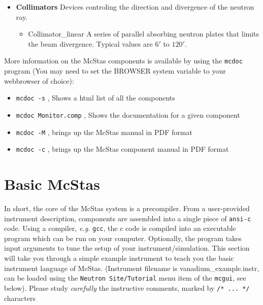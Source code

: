\begin{itemize}
\begin{itemize}
{        wavelengths of the passing neutron rays. (L is for $\lambda$).}
    \item{Monitor\_nD. General monitor for detecting all sorts of
        physical properties of the neutron ray. In our cases used with
        options:}
      \begin{itemize}
      \item{'single' - as PSD\_monitor but only one small square.}
      \item{'banana' - as PSD\_monitor but shaped like a curved,
          horizontal band.}
      \end{itemize}
    \end{itemize}
  \item{{\bf Collimators}} Devices controling the direction and divergence
   of the neutron ray.
    \begin{itemize}
      \item{Collimator\_linear} A series of parallel absorbing neutron plates
       that limits the beam divergence. 
       Typical values are $6'$ to $120'$.
    \end{itemize}
  \end{itemize}
More information on the McStas components is available by using the
\verb+mcdoc+ program (You may need to set the BROWSER system variable
to your webbrowser of choice):
\begin{itemize}
\item{\verb+mcdoc -s+ , Shows a html list of all the components}
\item{\verb+mcdoc Monitor.comp+ , Shows the documentation for a given component}
\item{\verb+mcdoc -M+ , brings up the McStas manual in PDF format}
\item{\verb+mcdoc -c+ , brings up the McStas component manual in PDF format}
\end{itemize}

\section{Basic McStas}
In short, the core of the McStas system is a precompiler. From a
user-provided instrument description, components are assembled into 
a single piece of \texttt{ansi-c} code. Using a compiler, \emph{e.g.} 
\texttt{gcc}, the c code is compiled into an executable program 
which can be run on your computer. Optionally, the program takes 
input arguments to tune the setup of your instrument/simulation. 
This section will take you through a simple example instrument 
to teach you the basic instrument language of McStas. (Instrument 
filename is vanadium\_example.instr, can be loaded using the
\verb+Neutron Site/Tutorial+ menu item of the \verb+mcgui+, see below).\vspace{1cm}
Please study \emph{carefully} the instructive comments,
marked by \verb+/* ... */+ characters
    
